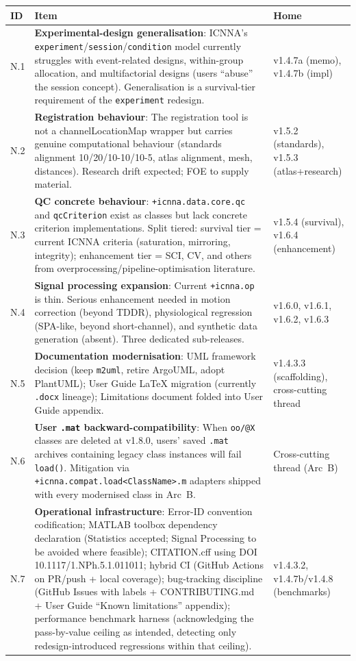 \documentclass[11pt,a4paper]{article}
\begin{document}
\begin{longtable}{p{1.5cm}p{11.5cm}p{2cm}}
\toprule
\textbf{ID} & \textbf{Item} & \textbf{Home} \\
\midrule
\endhead
N.1 & \textbf{Experimental-design generalisation}: ICNNA's \texttt{experiment}/\texttt{session}/\texttt{condition} model currently struggles with event-related designs, within-group allocation, and multifactorial designs (users ``abuse'' the session concept). Generalisation is a survival-tier requirement of the \texttt{experiment} redesign. & v1.4.7a (memo), v1.4.7b (impl) \\
N.2 & \textbf{Registration behaviour}: The registration tool is not a channelLocationMap wrapper but carries genuine computational behaviour (standards alignment 10/20/10-10/10-5, atlas alignment, mesh, distances). Research drift expected; FOE to supply material. & v1.5.2 (standards), v1.5.3 (atlas+research) \\
N.3 & \textbf{QC concrete behaviour}: \texttt{+icnna.data.core.qc} and \texttt{qcCriterion} exist as classes but lack concrete criterion implementations. Split tiered: survival tier = current ICNNA criteria (saturation, mirroring, integrity); enhancement tier = SCI, CV, and others from overprocessing/pipeline-optimisation literature. & v1.5.4 (survival), v1.6.4 (enhancement) \\
N.4 & \textbf{Signal processing expansion}: Current \texttt{+icnna.op} is thin. Serious enhancement needed in motion correction (beyond TDDR), physiological regression (SPA-like, beyond short-channel), and synthetic data generation (absent). Three dedicated sub-releases. & v1.6.0, v1.6.1, v1.6.2, v1.6.3 \\
N.5 & \textbf{Documentation modernisation}: UML framework decision (keep \texttt{m2uml}, retire ArgoUML, adopt PlantUML); User Guide LaTeX migration (currently \texttt{.docx} lineage); Limitations document folded into User Guide appendix. & v1.4.3.3 (scaffolding), cross-cutting thread \\
N.6 & \textbf{User \texttt{.mat} backward-compatibility}: When \texttt{oo/@X} classes are deleted at v1.8.0, users' saved \texttt{.mat} archives containing legacy class instances will fail \texttt{load()}. Mitigation via \texttt{+icnna.compat.load<ClassName>.m} adapters shipped with every modernised class in Arc~B. & Cross-cutting thread (Arc~B) \\
N.7 & \textbf{Operational infrastructure}: Error-ID convention codification; MATLAB toolbox dependency declaration (Statistics accepted; Signal Processing to be avoided where feasible); CITATION.cff using DOI 10.1117/1.NPh.5.1.011011; hybrid CI (GitHub Actions on PR/push + local coverage); bug-tracking discipline (GitHub Issues with labels + CONTRIBUTING.md + User Guide ``Known limitations'' appendix); performance benchmark harness (acknowledging the pass-by-value ceiling as intended, detecting only redesign-introduced regressions within that ceiling). & v1.4.3.2, v1.4.7b/v1.4.8 (benchmarks) \\
\bottomrule
\end{longtable}
\end{document}
